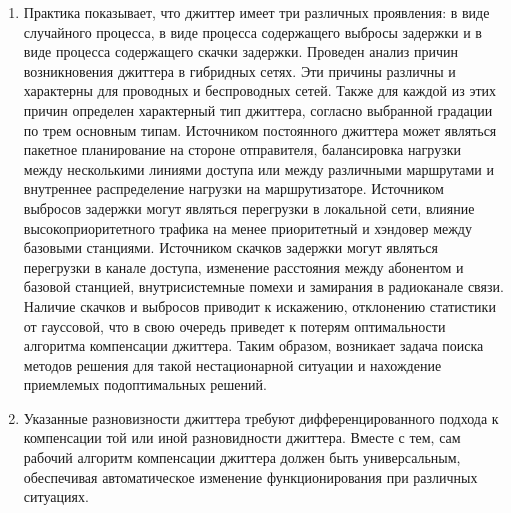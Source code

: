 \begin{enumerate}
\item 
Практика показывает, что джиттер имеет три различных проявления:
в виде случайного процесса, в виде процесса содержащего выбросы задержки
и в виде процесса содержащего скачки задержки.
Проведен анализ причин возникновения джиттера в гибридных сетях.
Эти причины различны и характерны для проводных и беспроводных сетей.
Также для каждой из этих причин определен характерный тип джиттера, согласно выбранной градации по трем основным типам.
Источником постоянного джиттера может являться пакетное планирование на стороне отправителя, балансировка нагрузки между несколькими линиями доступа или между различными маршрутами и внутреннее распределение нагрузки на маршрутизаторе.
Источником выбросов задержки могут являться перегрузки в локальной сети, влияние высокоприоритетного трафика на менее приоритетный и хэндовер между базовыми станциями.
Источником скачков задержки могут являться перегрузки в канале доступа, изменение расстояния между абонентом и базовой станцией, внутрисистемные помехи и замирания в радиоканале связи.
Наличие скачков и выбросов приводит к искажению, отклонению статистики от гауссовой, что в свою очередь приведет к потерям оптимальности алгоритма компенсации джиттера. 
Таким образом, возникает задача поиска методов решения для такой нестационарной ситуации и нахождение приемлемых подоптимальных решений.

\item Указанные разновизности джиттера требуют дифференцированного подхода к компенсации той или иной разновидности джиттера.
Вместе с тем, сам рабочий алгоритм компенсации джиттера должен быть универсальным, обеспечивая автоматическое изменение функционирования при различных ситуациях.


\end{enumerate}
